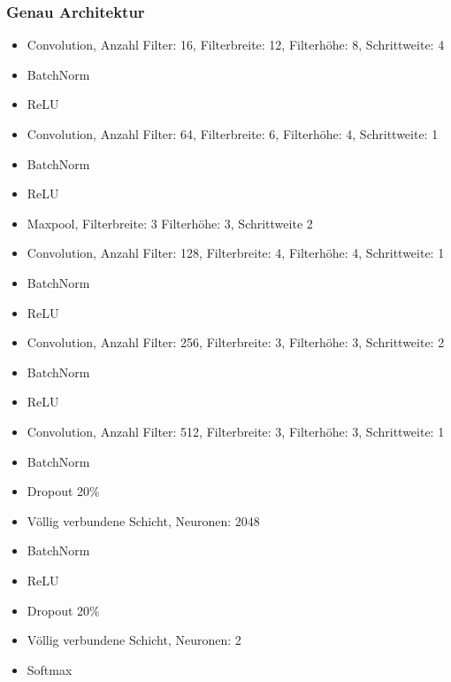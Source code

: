 \documentclass[12pt,a4paper]{report}
\begin{document}
\subsubsection{Genau Architektur}

\begin{itemize}
    \setlength\itemsep{0cm}
    \setlength{\parskip}{0pt}
    \setlength{\parsep}{0pt}
    \item Convolution, Anzahl Filter: 16, Filterbreite: 12, Filterhöhe: 8, Schrittweite: 4
    \item BatchNorm
    \item ReLU
    \item Convolution, Anzahl Filter: 64, Filterbreite: 6, Filterhöhe: 4, Schrittweite: 1
    \item BatchNorm
    \item ReLU
    \item Maxpool, Filterbreite: 3 Filterhöhe: 3, Schrittweite 2
    \item Convolution, Anzahl Filter: 128, Filterbreite: 4, Filterhöhe: 4, Schrittweite: 1
    \item BatchNorm
    \item ReLU
    \item Convolution, Anzahl Filter: 256, Filterbreite: 3, Filterhöhe: 3, Schrittweite: 2
    \item BatchNorm
    \item ReLU
    \item Convolution, Anzahl Filter: 512, Filterbreite: 3, Filterhöhe: 3, Schrittweite: 1
    \item BatchNorm
    \item Dropout 20\%
    \item Völlig verbundene Schicht, Neuronen: 2048
    \item BatchNorm
    \item ReLU
    \item Dropout 20\%
    \item Völlig verbundene Schicht, Neuronen: 2
    \item Softmax
\end{itemize}
\end{document}
